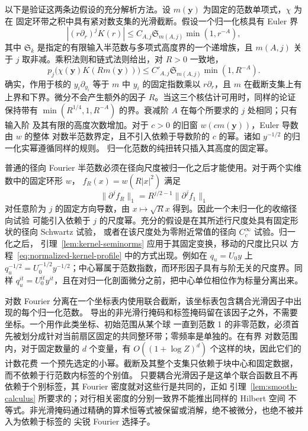 \documentclass[11pt,a4paper]{article}
\numberwithin{equation}{section}
\numberwithin{figure}{section}
\theoremstyle{definition}
\theoremstyle{remark}
\begin{document}
以下是验证这两条边假设的充分解析方法。设 $m(\boldsymbol y)$ 为固定的范数单项式，$\chi$ 为在
固定环带之积中具有紧对数支集的光滑截断。假设一个归一化核具有 Euler 界
\[
 |(r\partial_r)^jK(r)|\le C_{A,j}\mathfrak S_{m(A,j)}
                                      \min(1,r^{-A}),
\]
其中 $\mathfrak S_k$ 是指定的有限输入半范数与多项式高度界的一个递增族，且 $m(A,j)$ 关于 $j$
取非减。乘积法则和链式法则给出，对 $R>0$ 一致地，
\begin{equation}\label{eq:normalized-kernel-profile}
 p_j\bigl(\chi(\boldsymbol y)K(Rm(\boldsymbol y))\bigr)
 \le C'_{A,j}\mathfrak S_{m(A,j)}\min(1,R^{-A}).
\end{equation}
确实，作用于核的 $y_i\partial_{y_i}$ 等于 $m$ 中 $y_i$ 的固定指数乘以 $r\partial_r$，且
$m$ 在截断支集上有上界和下界。微分不会产生额外的因子 $R$。当这三个核估计可用时，同样的论证
保持带有 $\min(R^{1/4},1,R^{-A})$ 的界。衰减阶 $A$ 在每个所要求的 $j$ 处相同；只有输入阶
及其有限的高度次数增加。对于 $c>0$ 的旧窗 $w(c m(\boldsymbol y))$，Euler 导数由 $w$ 的整体
对数半范数界定，且不引入依赖于导数阶的 $c$ 的幂。诸如 $y^{-1/2}$ 的归一化实幂遵循同样的规则。
归一化范数的纯扭转只插入其高度的固定幂。

普通的径向 Fourier 半范数必须在径向尺度被归一化之后才能使用。对于两个实维数中的固定环形 $w$，
$f_R(x)=w(R|x|^2)$ 满足
\[
 \|\partial^j f_R\|_1=R^{j/2-1}\|\partial^j f_1\|_1
\]
对任意阶为 $j$ 的固定方向导数，由 $x\mapsto\sqrt R x$ 得到。因此一个未归一化的收缩径向试验
可能引入依赖于 $j$ 的尺度幂。充分的假设是在其所述行尺度处具有固定形状的径向 Schwartz 试验，
或者在该尺度处为零附近常值的径向 $C_c^\infty$ 试验。归一化之后，
引理~\ref{lem:kernel-seminorms} 应用于其固定变换，移动的尺度比只以
方程~\eqref{eq:normalized-kernel-profile} 中的方式出现。例如在 $q_u=U_0y$ 上
$q_u^{-1/2}=U_0^{-1/2}y^{-1/2}$；中心幂属于范数指数，而环形因子具有与阶无关的尺度界。同样
$q_u^{it}=U_0^{it}y^{it}$，且在对归一化剖面微分之前，把中心单位相位作为标量分离出来。

对数 Fourier 分离在一个坐标表内使用联合截断，该坐标表包含耦合光滑因子中出现的每个归一化范数。
导出的非光滑行掩码和标签掩码留在该因子之外，不需要坐标。一个用作此类坐标、初始范围从某个球
一直到范数 1 的非零范数，必须首先被划分成针对当前扇区固定的共同整环带；零频率是单独的。在有界
对数范围内，对于固定数量的 $d$ 个变量，有 $O((1+\log Z)^d)$ 个这样的块，因此它们的计数花费
一个预先选定的小幂。截断及其整个支集只依赖于块中心和固定数据，而不依赖于行范数内标签的个别值。
只要耦合光滑因子是这单个联合函数且不再依赖于个别标签，其 Fourier 密度就对这些行是共同的，正如
引理~\ref{lem:smooth-calculus} 所要求的；对行相关密度的分别一致界不能推出同样的 Hilbert 空间
不等式。非光滑掩码通过精确的算术恒等式被保留或消解，绝不被微分，也绝不被并入为依赖于标签的
尖锐 Fourier 选择子。
\end{document}
